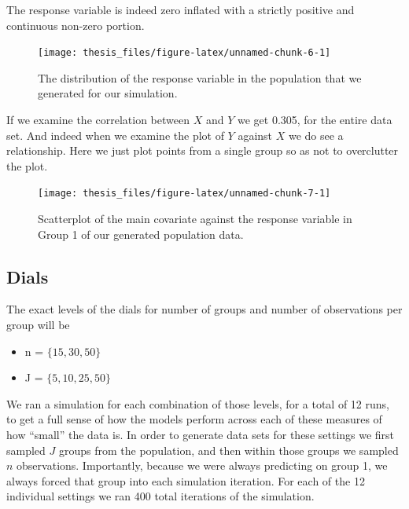 \documentclass[12pt,twoside]{reedthesis}
\providecommand{\tightlist}{%
  \setlength{\itemsep}{0pt}\setlength{\parskip}{0pt}}
\begin{document}
The response variable is indeed zero inflated with a strictly positive and continuous non-zero portion.
\begin{figure}

{\centering \texttt{[image: thesis\_files/figure-latex/unnamed-chunk-6-1]} 

}

\caption{The distribution of the response variable in the population that we generated for our simulation.}\label{fig:unnamed-chunk-6}
\end{figure}
If we examine the correlation between \(X\) and \(Y\) we get 0.305, for the entire data set. And indeed when we examine the plot of \(Y\) against \(X\) we do see a relationship. Here we just plot points from a single group so as not to overclutter the plot.
\begin{figure}

{\centering \texttt{[image: thesis\_files/figure-latex/unnamed-chunk-7-1]} 

}

\caption{Scatterplot of the main covariate against the response variable in Group 1 of our generated population data.}\label{fig:unnamed-chunk-7}
\end{figure}
\hypertarget{dials}{%
\subsection{Dials}\label{dials}}

The exact levels of the dials for number of groups and number of observations per group will be
\begin{itemize}
\tightlist
\item
  n = \(\{15, 30, 50\}\)
\item
  J = \(\{5, 10, 25, 50\}\)
\end{itemize}
We ran a simulation for each combination of those levels, for a total of 12 runs, to get a full sense of how the models perform across each of these measures of how ``small'' the data is. In order to generate data sets for these settings we first sampled \(J\) groups from the population, and then within those groups we sampled \(n\) observations. Importantly, because we were always predicting on group 1, we always forced that group into each simulation iteration. For each of the 12 individual settings we ran 400 total iterations of the simulation.
\end{document}
